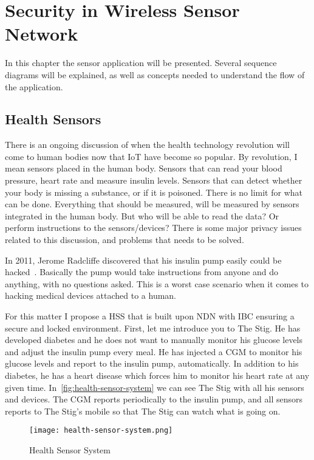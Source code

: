 \chapter{Security in Wireless Sensor Network}\label{sensor-application}
In this chapter the sensor application will be presented. 
Several sequence diagrams will be explained, as well as concepts needed to understand the flow of the application. 

\section{Health Sensors}
There is an ongoing discussion of when the health technology revolution will come to human bodies now that \gls{IoT} have become so popular.
By revolution, I mean sensors placed in the human body. 
Sensors that can read your blood pressure, heart rate and measure insulin levels.
Sensors that can detect whether your body is missing a substance, or if it is poisoned. 
There is no limit for what can be done.
Everything that should be measured, will be measured by sensors integrated in the human body.
But who will be able to read the \gls{data}?
Or perform instructions to the sensors/devices?
There is some major privacy issues related to this discussion, and problems that needs to be solved.

In 2011, Jerome Radcliffe discovered that his insulin pump easily could be hacked~\cite{radcliffe2011hacking}.
Basically the pump would take instructions from anyone and do anything, with no questions asked. 
This is a worst case scenario when it comes to hacking medical devices attached to a human.

For this matter I propose a \gls{HSS} that is built upon \gls{NDN} with \gls{IBC} ensuring a secure and locked environment.
First, let me introduce you to The Stig. 
He has developed diabetes and he does not want to manually monitor his glucose levels and adjust the insulin pump every meal. 
He has injected a \gls{CGM} to monitor his glucose levels and report to the insulin pump, automatically.
In addition to his diabetes, he has a heart disease which forces him to monitor his heart rate at any given time. 
In~\autoref{fig:health-sensor-system} we can see The Stig with all his sensors and devices. 
The \gls{CGM} reports periodically to the insulin pump, and all sensors reports to The Stig's mobile so that The Stig can watch what is going on.

\begin{figure}[ht]
  \centering
  \texttt{[image: health-sensor-system.png]}
  \caption{Health Sensor System}
  \label{fig:health-sensor-system}
\end{figure}

